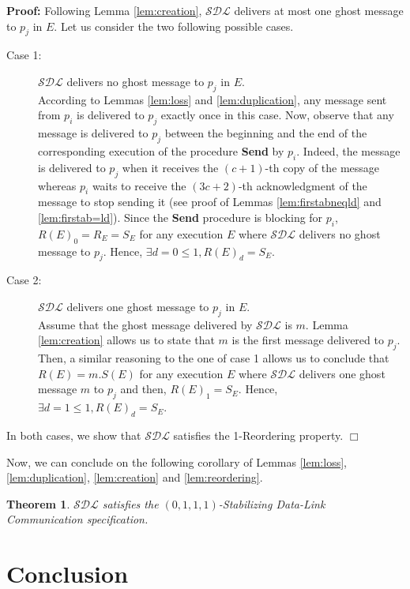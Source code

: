 \documentclass[11pt]{article}
\newtheorem{theorem}{Theorem}
\newenvironment{proof}{\noindent\textbf{Proof:}}{\hfill$\Box$}
\begin{document}
\begin{proof}
Following Lemma \ref{lem:creation}, $\mathcal{SDL}$ delivers at most one ghost message to $p_j$ in $E$. Let us consider the two following possible cases.

\begin{description}
\item[Case 1:] $\mathcal{SDL}$ delivers no ghost message to $p_j$ in $E$.\\
According to Lemmas \ref{lem:loss} and \ref{lem:duplication}, any message sent from $p_i$ is delivered to $p_j$ exactly once in this case. Now, observe that any message is delivered to $p_j$ between the beginning and the end of the corresponding execution of the procedure \textbf{Send} by $p_i$. Indeed, the message is delivered to $p_j$ when it receives the $(c+1)$-th copy of the message whereas $p_i$ waits to receive the $(3c+2)$-th acknowledgment of the message to stop sending it (see proof of Lemmas \ref{lem:firstabneqld} and \ref{lem:firstab=ld}). Since the \textbf{Send} procedure is blocking for $p_i$, $R(E)_0=R_E=S_E$ for any execution $E$ where $\mathcal{SDL}$ delivers no ghost message to $p_j$. Hence, $\exists d=0\leq 1,R(E)_d=S_E$.
\item[Case 2:] $\mathcal{SDL}$ delivers one ghost message to $p_j$ in $E$.\\
Assume that the ghost message delivered by $\mathcal{SDL}$ is $m$. Lemma \ref{lem:creation} allows us to state that $m$ is the first message delivered to $p_j$. Then, a similar reasoning to the one of case 1 allows us to conclude that $R(E)=m.S(E)$ for any execution $E$ where $\mathcal{SDL}$ delivers one ghost message $m$ to $p_j$ and then, $R(E)_1=S_E$. Hence, $\exists d=1\leq 1,R(E)_d=S_E$.
\end{description}

In both cases, we show that $\mathcal{SDL}$ satisfies the 1-Reordering property.
\end{proof}

Now, we can conclude on the following corollary of Lemmas \ref{lem:loss}, \ref{lem:duplication}, \ref{lem:creation} and \ref{lem:reordering}.

\begin{theorem}
$\mathcal{SDL}$ satisfies the $(0,1,1,1)$-Stabilizing Data-Link Communication specification.
\end{theorem}

\section{Conclusion}\label{sec:conclusion}
\end{document}
